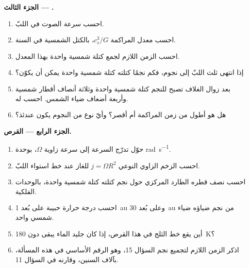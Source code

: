 \begin{problem}
\noindent\textbf{الجزء الثالث --- .}
\begin{enumerate}[resume]
  \item احسب سرعة الصوت في اللبّ.
  \item احسب معدل المراكمة $c_s^3/G$، بالكتل الشمسية في السنة.
  \item احسب الزمن اللازم لجمع كتلة شمسية واحدة بهذا المعدل.
  \item إذا انتهى ثلث اللبّ إلى نجوم، فكم نجمًا كتلته كتلة شمسية واحدة
        يمكن أن يكوّن؟
  \item بعد زوال الغلاف تصبح للنجم كتلة شمسية واحدة وثلاثة أنصاف أقطار
        شمسية وأربعة أضعاف ضياء الشمس. احسب  له.
  \item هل هو أطول من زمن المراكمة أم أقصر؟ وأيّ نوع من النجوم يكون
        عندئذ؟
\end{enumerate}

\noindent\textbf{الجزء الرابع --- القرص.}
\begin{enumerate}[resume]
  \item حوّل تدرّج السرعة إلى سرعة زاوية $\Omega$، بوحدة
        \unit{rad.s^{-1}}.
  \item احسب الزخم الزاوي النوعي $j = \Omega R^2$ للغاز عند
        خط استواء اللبّ.
  \item احسب نصف قطره الطارد المركزي حول نجم كتلته كتلة شمسية واحدة، بالوحدات
        الفلكية.
  \item احسب درجة حرارة حبيبة على بُعد \qty{1}{au} وعلى بُعد \qty{30}{au}
        من نجم ضياؤه ضياء شمسي واحد.
  \item أين يقع خط الثلج في هذا القرص، إذا كان جليد الماء يبقى دون
        \qty{180}{K}؟
  \item اذكر الزمن اللازم لتجميع نجم السؤال 15، وهو الرقم الأساسي
        في هذه المسألة، بآلاف السنين، وقارنه  في السؤال 11.
\end{enumerate}
\end{problem}
